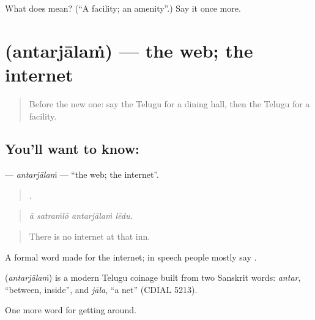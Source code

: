 \begin{tcolorbox}[breakable,colback=teal!4,colframe=teal!35!black,title={Before you move on}]
What does  mean? (\textquotedblleft{}A facility; an amenity\textquotedblright{}.) Say it once more.
\end{tcolorbox}
\section[\texorpdfstring{\te{అంతర్జాలం} (antarjālaṁ)}{అంతర్జాలం (antarjālaṁ)}]{ (antarjālaṁ) — the web; the internet}

\label{lesson:TE-C459-antarjalam}



\begin{quote}
Before the new one: say the Telugu for a dining hall, then the Telugu for a facility.
\end{quote}

\subsection*{You'll want to know: }
\textbf{} — \emph{antarjālaṁ} — \textquotedblleft{}the web; the internet\textquotedblright{}.

\begin{quote}
   .
\end{quote}

\begin{quote}
\emph{ā satraṁlō antarjālaṁ lēdu.}
\end{quote}

\begin{quote}
There is no internet at that inn.
\end{quote}

A formal word made for the internet; in speech people mostly say .

\begin{cousinweb}
\textbf{} (\emph{antarjālaṁ}) is a modern Telugu coinage built from two Sanskrit words: \emph{antar}, \textquotedblleft{}between, inside\textquotedblright{}, and \emph{jāla}, \textquotedblleft{}a net\textquotedblright{} (CDIAL 5213).
\end{cousinweb}

\begin{grammarlens}[title={What you've built}]
One more word for getting around.
\end{grammarlens}

